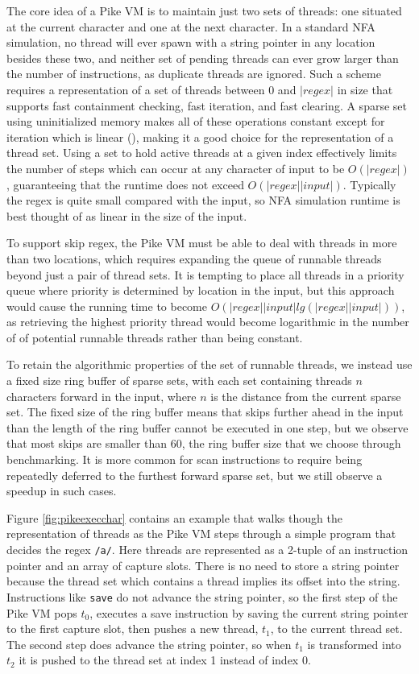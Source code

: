 The core idea of a Pike VM is to maintain just two sets of threads:
one situated at the current character and one at the next character.
In a standard NFA simulation, no thread will ever spawn with
a string pointer in any location besides these two, and
neither set of pending threads can ever grow larger than
the number of instructions, as duplicate threads are ignored.
Such a scheme requires a representation of a set of threads
between $0$ and $|regex|$ in size that supports fast containment
checking, fast iteration, and fast clearing. A sparse set using
uninitialized memory makes all of these operations constant except
for iteration which is linear (\cite{Briggs1993}), making it
a good choice for the representation of a thread set. Using
a set to hold active threads at a given index
effectively limits the number of steps which can occur
at any character of input to be $O(|regex|)$, guaranteeing that
the runtime does not exceed $O(|regex||input|)$. Typically the regex
is quite small compared with the input, so NFA simulation runtime is best
thought of as linear in the size of the input.

To support skip regex, the Pike VM must be able to deal
with threads in more than two locations, which requires expanding
the queue of runnable threads beyond just a pair of thread sets.
It is tempting to place all threads in a priority queue where
priority is determined by location in the input,
but this approach would cause the running time to become
$O(|regex||input|lg(|regex||input|))$, as retrieving the highest
priority thread would become logarithmic in the number of
of potential runnable threads rather than being constant.

To retain the algorithmic properties of the set of runnable threads,
we instead use a fixed size ring buffer of sparse sets, with
each set containing threads $n$ characters forward in the input,
where $n$ is the distance from the current sparse set. The fixed
size of the ring buffer means
that skips further ahead in the input than the length of the ring
buffer cannot be executed in one step, but we observe that most
skips are smaller than $60$, the ring buffer size that we choose
through benchmarking. It is more common for scan instructions to
require being repeatedly deferred to the furthest forward sparse set,
but we still observe a speedup in such cases.

Figure \ref{fig:pikeexecchar} contains an example that walks though
the representation of threads as the Pike VM steps through a simple
program that decides the regex \verb'/a/'. Here threads are represented as
a 2-tuple of an instruction pointer and an array of capture slots.
There is no need to store a string pointer because the thread set
which contains a thread implies its offset into the string.
Instructions like \verb'save' do not advance the string pointer,
so the first step of the Pike VM pops $t_0$, executes a save instruction
by saving the current string pointer to the first capture slot, then
pushes a new thread, $t_1$, to the current thread set. The second step
does advance the string pointer, so when $t_1$ is transformed into $t_2$
it is pushed to the thread set at index 1 instead of index 0.

